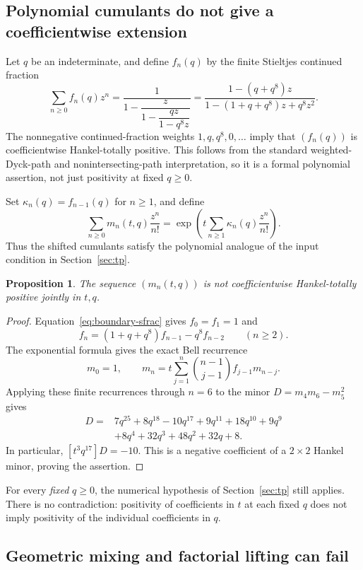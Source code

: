 \documentclass[11pt,a4paper]{article}
\newtheorem{proposition}[theorem]{Proposition}
\theoremstyle{definition}
\theoremstyle{remark}
\numberwithin{equation}{section}
\begin{document}
\subsection{Polynomial cumulants do not give a coefficientwise extension}

Let $q$ be an indeterminate, and define $f_n(q)$ by the finite Stieltjes
continued fraction
\begin{equation}\label{eq:boundary-sfrac}
 \sum_{n\ge0}f_n(q)z^n
 =\frac{1}{1-\dfrac{z}{1-\dfrac{qz}{1-q^8z}}}
 =\frac{1-(q+q^8)z}{1-(1+q+q^8)z+q^8z^2}.
\end{equation}
The nonnegative continued-fraction weights $1,q,q^8,0,\ldots$ imply
that $(f_n(q))$ is coefficientwise Hankel-totally positive. This follows
from the standard weighted-Dyck-path and nonintersecting-path
interpretation, so it is a formal polynomial assertion, not just
positivity at fixed $q\ge0$.

Set $\kappa_n(q)=f_{n-1}(q)$ for $n\ge1$, and define
\[
 \sum_{n\ge0}m_n(t,q)\frac{z^n}{n!}
 =\exp\left(t\sum_{n\ge1}\kappa_n(q)\frac{z^n}{n!}\right).
\]
Thus the shifted cumulants satisfy the polynomial analogue of the input
condition in Section~\ref{sec:tp}.

\begin{proposition}
The sequence $(m_n(t,q))$ is not coefficientwise Hankel-totally positive
jointly in $t,q$.
\end{proposition}
\begin{proof}
Equation~\eqref{eq:boundary-sfrac} gives $f_0=f_1=1$ and
\[
 f_n=(1+q+q^8)f_{n-1}-q^8f_{n-2}\qquad(n\ge2).
\]
The exponential formula gives the exact Bell recurrence
\[
 m_0=1,\qquad
 m_n=t\sum_{j=1}^{n}\binom{n-1}{j-1}f_{j-1}m_{n-j}.
\]
Applying these finite recurrences through $n=6$ to the minor
$D=m_4m_6-m_5^2$ gives
\begin{align*}
 [t^3]D={}&7q^{25}+8q^{18}-10q^{17}+9q^{11}+18q^{10}+9q^9\\
          &+8q^4+32q^3+48q^2+32q+8.
\end{align*}
In particular, $[t^3q^{17}]D=-10$. This is a negative coefficient of a
$2\times2$ Hankel minor, proving the assertion.
\end{proof}

For every \emph{fixed} $q\ge0$, the numerical hypothesis of
Section~\ref{sec:tp} still applies. There is no contradiction: positivity
of coefficients in $t$ at each fixed $q$ does not imply positivity of the
individual coefficients in $q$.

\subsection{Geometric mixing and factorial lifting can fail}
\end{document}

